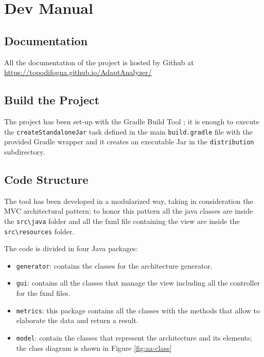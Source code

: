 \addappheadtotoc
\chapter{Dev Manual}
\label{app:usermanual}
\section{Documentation}
All the documentation of the project is hosted by Github \cite{github} at \url{https://topodifogna.github.io/AdaptAnalyzer/}
\section{Build the Project}
The project has been set-up with the Gradle Build Tool \cite{gradle}; it is enough to execute the \texttt{createStandaloneJar} task defined in the main \texttt{build.gradle} file with the provided Gradle wrapper and it creates an executable Jar in the \texttt{distribution} subdirectory.
\section{Code Structure}
The tool has been developed in a modularized way, taking in consideration the MVC architectural pattern; to honor this pattern all the java classes are inside the \texttt{src\textbackslash java} folder and all the fxml file containing the view are inside the \texttt{src\textbackslash resources} folder.

\noindent The code is divided in four Java packages:
\begin{itemize}
	\item \texttt{generator}: contains the classes for the architecture generator.
	\item \texttt{gui}: contains all the classes that manage the view including all the controller for the fxml files.
	\item \texttt{metrics}: this package contains all the classes with the methods that allow to elaborate the data and return a result.
	\item \texttt{model}: contain the classes that represent the architecture and its elements; the class diagram is shown in Figure \ref{fig:aa-class}
\end{itemize}

